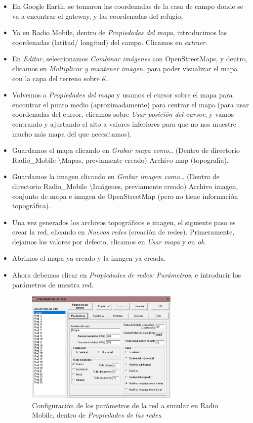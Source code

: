 \documentclass[12pt]{article}
\begin{document}
	\begin{itemize}
		\item En Google Earth, se tomaron las coordenadas de la casa de campo donde se va a encontrar el gateway, y las coordenadas del refugio.
		\item Ya en Radio Mobile, dentro de \textit{Propiedades del mapa}, introducimos las coordenadas (latitud/ longitud) del campo. Clicamos en \textit{extraer}.
		\item En \textit{Editar}, seleccionamos \textit{Combinar imágenes} con OpenStreetMaps, y dentro, clicamos en \textit{Multiplicar y mantener imagen}, para poder visualizar el mapa con la capa del terreno sobre él. 
		\item Volvemos a \textit{Propiedades del mapa} y usamos el cursor sobre el mapa para encontrar el punto medio (aproximadamente) para centrar el mapa (para usar coordenadas del cursor, clicamos sobre \textit{Usar posición del cursor}, y vamos centrando y ajustando el alto a valores inferiores para que no nos muestre mucho más mapa del que necesitamos).
		\item Guardamos el mapa clicando en \textit{Grabar mapa como…} (Dentro de directorio Radio\_Mobile \textbackslash Mapas, previamente creado) Archivo map (topografía).
		\item Guardamos la imagen clicando en \textit{Grabar imagen como…}  (Dentro de directorio Radio\_Mobile \textbackslash Imágenes, previamente creado) Archivo imagen, conjunto de mapa e imagen de OpenStreetMap (pero no tiene información topográfica).
		\item Una vez generados los archivos topográficos e imagen, el siguiente paso es crear la red, clicando en \textit{Nuevas redes} (creación de redes). Primeramente, dejamos los valores por defecto, clicamos en \textit{Usar mapa} y en \textit{ok}.
		\item Abrimos el mapa ya creado y la imagen ya creada.
		\item Ahora debemos clicar en \textit{Propiedades de redes: Parámetros}, e introducir los parámetros de nuestra red.
		
		\begin{figure}[h]
			\begin{center}
				\includegraphics[width=0.7\textwidth]{img/prop_redes_radiomobile.png}
				\caption{Configuración de los parámetros de la red a simular en Radio Mobile, dentro de \textit{Propiedades de las redes}.}
				\label{Prop redes param radiomobile}
			\end{center}
		\end{figure}
		

\end{itemize}
\end{document}
